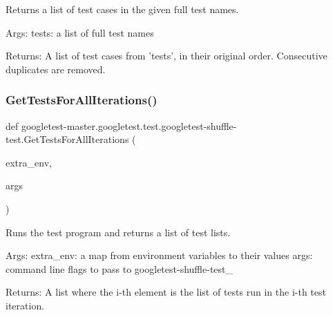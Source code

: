\begin{DoxyVerb}Returns a list of test cases in the given full test names.

Args:
  tests: a list of full test names

Returns:
  A list of test cases from 'tests', in their original order.
  Consecutive duplicates are removed.
\end{DoxyVerb}
 \mbox{\label{namespacegoogletest-master_1_1googletest_1_1test_1_1googletest-shuffle-test_a140dbf3b6aebd523a89a2f420190d940}} 
\subsubsection{\texorpdfstring{GetTestsForAllIterations()}{GetTestsForAllIterations()}}
{\footnotesize\ttfamily def googletest-\/master.\+googletest.\+test.\+googletest-\/shuffle-\/test.\+Get\+Tests\+For\+All\+Iterations (\begin{DoxyParamCaption}\item[{}]{extra\+\_\+env,  }\item[{}]{args }\end{DoxyParamCaption})}

\begin{DoxyVerb}Runs the test program and returns a list of test lists.

Args:
  extra_env: a map from environment variables to their values
  args: command line flags to pass to googletest-shuffle-test_

Returns:
  A list where the i-th element is the list of tests run in the i-th
  test iteration.
\end{DoxyVerb}
 \mbox{\label{namespacegoogletest-master_1_1googletest_1_1test_1_1googletest-shuffle-test_a0c7133f025e23be1b95a9f0ae34563ec}} 
